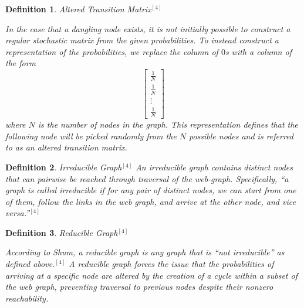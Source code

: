 \documentclass{article}
\newtheorem{definition}{Definition}
\begin{document}
    \begin{definition}{Altered Transition Matrix$^{[4]}$}
    
    \noindent
    \textup{In the case that a dangling node exists, it is not initially possible to construct a regular stochastic matrix from the given probabilities. To instead construct a representation of the probabilities, we replace the column of $0$s with a column of the form
    $$\begin{bmatrix} \frac{1}{N} \\ \frac{1}{N} \\ \vdots \\ \frac{1}{N} \end{bmatrix}$$ where $N$ is the number of nodes in the graph. This representation defines that the following node will be picked randomly from the $N$ possible nodes and is referred to as an altered transition matrix.}
    
    \end{definition}
    
    \begin{definition}{Irreducible Graph$^{[4]}$ }
    \noindent
    \textup{An irreducible graph contains distinct nodes that can pairwise be reached through traversal of the web-graph. Specifically, ``a graph is called irreducible if for any pair of distinct nodes, we can start from one of them, follow  the links in the web graph, and arrive at the other node, and vice versa.''$^{[4]}$}
    
    \end{definition}
    
    \begin{definition}{Reducible Graph$^{[4]}$}

    \noindent
    \textup{According to Shum, a reducible graph is any graph that is ``not irreducible'' as defined above.$^{[4]}$ A reducible graph forces the issue that the probabilities of arriving at a specific node are altered by the creation of a cycle within a subset of the web graph, preventing traversal to previous nodes despite their nonzero reachability.}
    
    \end{definition}
    
\end{document}
